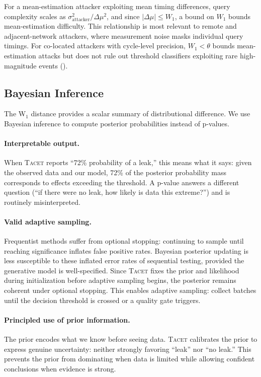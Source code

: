 \documentclass[letterpaper,twocolumn,10pt]{article}
\newcommand{\tacet}{\textsc{Tacet}\xspace}
\begin{document}
For a mean-estimation attacker exploiting mean timing differences,
query complexity scales as $\sigma^2_{\text{attacker}} / \Delta\mu^2$,
and since $|\Delta\mu| \leq W_1$, a bound on $W_1$ bounds
mean-estimation difficulty.
This relationship is most relevant to remote and adjacent-network attackers,
where measurement noise masks individual query timings. For co-located attackers with cycle-level precision,
$W_1 < \theta$ bounds mean-estimation attacks but does not rule out threshold
classifiers exploiting rare high-magnitude events ().

\subsection{Bayesian Inference}
\label{sec:approach:inference}

The W$_1$ distance provides a scalar summary of distributional difference. We use
Bayesian inference to compute posterior probabilities instead of p-values.

\paragraph{Interpretable output.}
When \tacet reports ``72\% probability of a leak,'' this means what it says:
given the observed data and our model, 72\% of the posterior probability mass
corresponds to effects exceeding the threshold. A p-value answers a different
question (``if there were no leak, how likely is data this extreme?'') and is
routinely misinterpreted.

\paragraph{Valid adaptive sampling.}
Frequentist methods suffer from optional stopping: continuing to sample until
reaching significance inflates false positive rates. Bayesian posterior updating
is less susceptible to these inflated error rates of sequential testing, provided
the generative model is well-specified. Since \tacet fixes the prior and likelihood
during initialization before adaptive sampling begins, the posterior remains coherent
under optional stopping. This enables adaptive sampling: collect batches until
the decision threshold is crossed or a quality gate triggers.

\paragraph{Principled use of prior information.}
The prior encodes what we know before seeing data. \tacet calibrates the prior
to express genuine uncertainty: neither strongly favoring ``leak'' nor ``no leak.''
This prevents the prior from dominating when data is limited while allowing
confident conclusions when evidence is strong.
\end{document}
